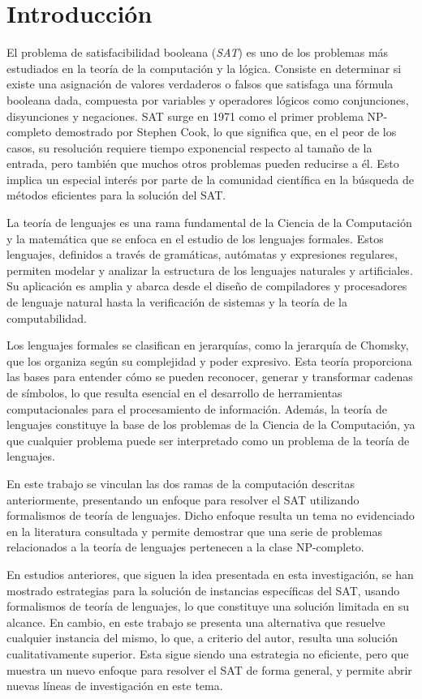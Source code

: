 \chapter*{Introducción}

El problema de satisfacibilidad booleana (\textit{SAT}) es uno de los problemas más estudiados en la teoría de la computación y la lógica.
Consiste en determinar si existe una asignación de valores verdaderos o falsos que satisfaga una fórmula booleana dada, compuesta
por variables y operadores lógicos como conjunciones, disyunciones y negaciones. SAT surge en 1971 como el primer problema NP-completo demostrado por
Stephen Cook,
lo que significa que, en el peor de los casos, su resolución requiere tiempo exponencial respecto al
tamaño de la entrada, pero también que muchos otros problemas pueden reducirse a él. Esto
implica un especial interés por parte de la comunidad científica en la búsqueda de métodos eficientes para la solución
del SAT.

La teoría de lenguajes es una rama fundamental de la Ciencia de la Computación y la matemática que se
enfoca en el estudio de los lenguajes formales. Estos lenguajes, definidos a través de gramáticas,
autómatas y expresiones regulares, permiten modelar y analizar la estructura de los lenguajes naturales y
artificiales. Su aplicación es amplia y abarca desde el diseño de compiladores y procesadores de lenguaje
natural hasta la verificación de sistemas y la teoría de la computabilidad.

Los lenguajes formales se
clasifican en jerarquías, como la jerarquía de Chomsky, que los organiza según su complejidad y poder
expresivo. Esta teoría proporciona las bases para entender cómo se pueden reconocer, generar y transformar
cadenas de símbolos, lo que resulta esencial en el desarrollo de herramientas computacionales para
el procesamiento de información. Además, la teoría de lenguajes constituye la base de los problemas de la Ciencia
de la Computación, ya que cualquier problema puede ser interpretado como un problema de la teoría de lenguajes.

En este trabajo se vinculan las dos ramas de la computación descritas anteriormente, presentando un enfoque para resolver el SAT
utilizando formalismos de teoría de lenguajes. Dicho enfoque resulta un tema no evidenciado en la literatura consultada
y permite demostrar que una serie de problemas relacionados a la teoría de lenguajes pertenecen a la clase NP-completo.

En estudios anteriores, que siguen la idea presentada en esta investigación, se han mostrado estrategias para la solución
de instancias específicas del SAT, usando formalismos de teoría de lenguajes, lo que constituye una solución limitada en su alcance.
En cambio, en este trabajo se presenta una alternativa que resuelve cualquier instancia del mismo, lo que, a criterio del autor, resulta una solución
cualitativamente superior. Esta sigue siendo una estrategia no eficiente, pero que
muestra un nuevo enfoque para resolver el SAT de forma general, y permite abrir nuevas líneas de investigación en este tema.

